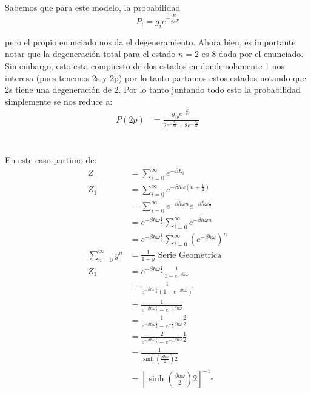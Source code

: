 \documentclass{report}
\begin{document}
\chapter{}

Sabemos que para este modelo, la probabilidad \[
	P_i = g_i e^{- \frac{E_i}{k_B T}}
\]

pero el propio enunciado nos da el degeneramiento. Ahora bien, es importante notar que la degeneración total para el estado $n = 2$ es $8$ dada por el enunciado. Sin embargo, esto esta compuesto de dos estados en donde solamente 1 nos interesa (pues tenemos 2s y 2p) por lo tanto partamos estos estados notando que 2s tiene una degeneración de $2$. Por lo tanto juntando todo esto la probabilidad simplemente se nos reduce a:
\begin{align*}
	P(2p) &= \frac{g_{2p} e^{- \frac{E_2}{k T}}}{2 e^{- \frac{E_i}{kT}} + 8 e^{-\frac{E_2}{k T}}}
\end{align*}


\chapter{}

\section{}

En este caso partimo de:
\begin{align*}
	Z &= \sum_{i = 0}^{\infty} e^{-\beta E_i}\\
	Z_1 &= \sum_{i = 0}^{\infty} e^{-\beta \hbar \omega \left( n + \frac{1}{2} \right)}\\
	&= \sum_{i = 0}^{\infty} e^{-\beta \hbar \omega n}  e^{- \beta \hbar \omega\frac{1}{2}}\\
	&= e^{- \beta \hbar \omega\frac{1}{2}} \sum_{i = 0}^{\infty} e^{-\beta \hbar \omega n}  \\
	&= e^{- \beta \hbar \omega\frac{1}{2}} \sum_{i = 0}^{\infty} \left(e^{-\beta \hbar \omega }\right)^n  \\
	\sum_{n=0}^{\infty} y^n &= \frac{1}{1 - y} \text{ Serie Geometrica}\\
	Z_1 &= e^{-\beta \hbar \omega \frac{1}{2}} \frac{1}{1 - e^{-\beta\hbar\omega}}\\
	&=  \frac{1}{e^{-\beta \hbar \omega \frac{1}{2}}\left(1 - e^{-\beta\hbar\omega}\right)}\\
	&=  \frac{1}{e^{-\beta \hbar \omega \frac{1}{2}} - e^{-\frac{1}{2}\beta\hbar\omega}}\\
	&=  \frac{1}{e^{-\beta \hbar \omega \frac{1}{2}} - e^{-\frac{1}{2}\beta\hbar\omega}} \frac{2}{2} \\
	&=  \frac{2}{e^{-\beta \hbar \omega \frac{1}{2}} - e^{-\frac{1}{2}\beta\hbar\omega}} \frac{1}{2} \\
	&=  \frac{1}{\sinh\left( \frac{\beta \hbar \omega}{2} \right) 2}  \\
	&=  \left[{\sinh\left( \frac{\beta \hbar \omega}{2} \right) 2}\right]^{-1} \square \\
\end{align*}
\end{document}
